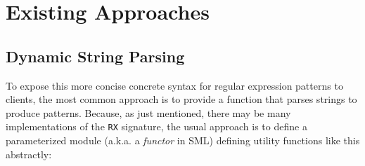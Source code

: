 \section{Existing Approaches}\label{sec:existing-approaches}

\subsection{Dynamic String Parsing}\label{sec:dynamic-string-parsing}
To expose this more concise concrete syntax for regular expression patterns to clients, the most common approach is to provide a function that parses strings to produce patterns. Because, as just mentioned, there  may be many implementations of the \lstinline{RX} signature, the usual approach is to define a parameterized module (a.k.a. a \emph{functor} in SML) defining utility functions like this abstractly:

